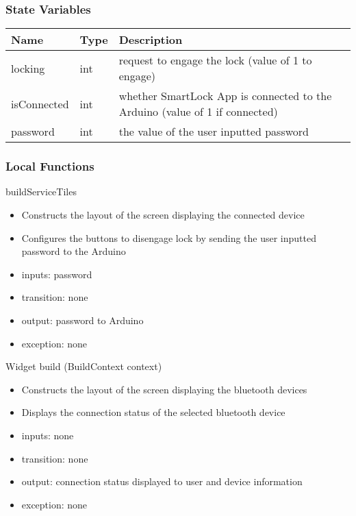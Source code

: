 \documentclass[12pt, titlepage]{article}
\begin{document}
\begin{itemize}
\subsubsection{State Variables}

\begin{center}
\begin{tabular}{p{4cm} p{4cm} p{6cm}}
\hline
\textbf{Name} & \textbf{Type} & \textbf{Description} \\
\hline
locking & int & request to engage the lock (value of 1 to engage) \\
isConnected & int & whether SmartLock App is connected to the Arduino (value of 1 if connected) \\
password & int & the value of the user inputted password \\
\hline
\end{tabular}
\end{center}

\subsubsection{Local Functions}

\noindent buildServiceTiles
\begin{itemize}
\item Constructs the layout of the screen displaying the connected device
\item Configures the buttons to disengage lock by sending the user inputted password to the Arduino 
\end{itemize}

\begin{itemize}
\item inputs: password
\item transition: none
\item output: password to Arduino
\item exception: none
\end{itemize}

\noindent Widget build (BuildContext context)
\begin{itemize}
\item Constructs the layout of the screen displaying the bluetooth devices
\item Displays the connection status of the selected bluetooth device
\end{itemize}

\begin{itemize}
\item inputs: none
\item transition: none
\item output: connection status displayed to user and device information
\item exception: none
\end{itemize}


\end{itemize}
\end{document}
